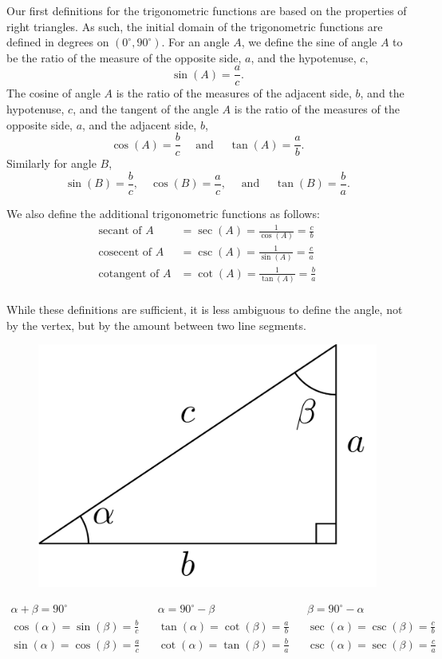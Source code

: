 \documentclass[
]{book}
\theoremstyle{definition}
\theoremstyle{definition}
\theoremstyle{definition}
\theoremstyle{definition}
\theoremstyle{remark}
\begin{document}
Our first definitions for the trigonometric functions are based on the properties of right triangles. As such, the initial domain of the trigonometric functions are defined in degrees on \((0^\circ,90^\circ)\). For an angle \(A\), we define the sine of angle \(A\) to be the ratio of the measure of the opposite side, \(a\), and the hypotenuse, \(c\),
\[\sin(A) = \frac{a}{c}.\]
The cosine of angle \(A\) is the ratio of the measures of the adjacent side, \(b\), and the hypotenuse, \(c\), and the tangent of the angle \(A\) is the ratio of the measures of the opposite side, \(a\), and the adjacent side, \(b\),
\[\cos(A) = \frac{b}{c} \quad  \mbox{ and } \quad \tan(A) = \frac{a}{b}.\]
Similarly for angle \(B\),
\[\sin(B) = \frac{b}{c}, \quad \cos(B) = \frac{a}{c}, \quad \mbox{ and } \quad \tan(B) = \frac{b}{a}.\]

We also define the additional trigonometric functions as follows:
\begin{align*}
\mbox{secant of }A &= \sec(A) = \frac{1}{\cos(A)} = \frac{c}{b} \\
\mbox{cosecent of }A &= \csc(A) = \frac{1}{\sin(A)} = \frac{c}{a} \\
\mbox{cotangent of } A &= \cot(A) = \frac{1}{\tan(A)} = \frac{b}{a} \\
\end{align*}

While these definitions are sufficient, it is less ambiguous to define the angle, not by the vertex, but by the amount between two line segments.

\begin{figure}

{\centering \includegraphics[width=0.3\linewidth]{tikz/right-triangle-trig2} 

}

\end{figure}

\begin{align*}
\alpha + \beta = 90^\circ & & \alpha = 90^\circ - \beta & & \beta=90^\circ - \alpha  \\
\cos(\alpha) = \sin(\beta) =  \frac{b}{c} & & \tan(\alpha) = \cot(\beta) = \frac{a}{b} & & \sec(\alpha) = \csc(\beta) = \frac{c}{b}\\
\sin(\alpha) = \cos(\beta) = \frac{a}{c} & & \cot(\alpha) = \tan(\beta) = \frac{b}{a} & & \csc(\alpha) = \sec(\beta) = \frac{c}{a} \\
\end{align*}
\end{document}
